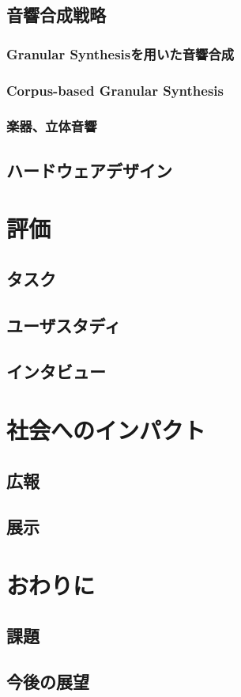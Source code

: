 \documentclass{jsarticle}
\begin{document}
\subsection{音響合成戦略}
\subsubsection{Granular Synthesisを用いた音響合成}
\subsubsection{Corpus-based Granular Synthesis}
\subsubsection{楽器、立体音響}
\subsection{ハードウェアデザイン}

\section{評価}
\subsection{タスク}
\subsection{ユーザスタディ}
\subsection{インタビュー}

\section{社会へのインパクト}
\subsection{広報}
\subsection{展示}
\section{おわりに}
\subsection{課題}
\subsection{今後の展望}
\end{document}
